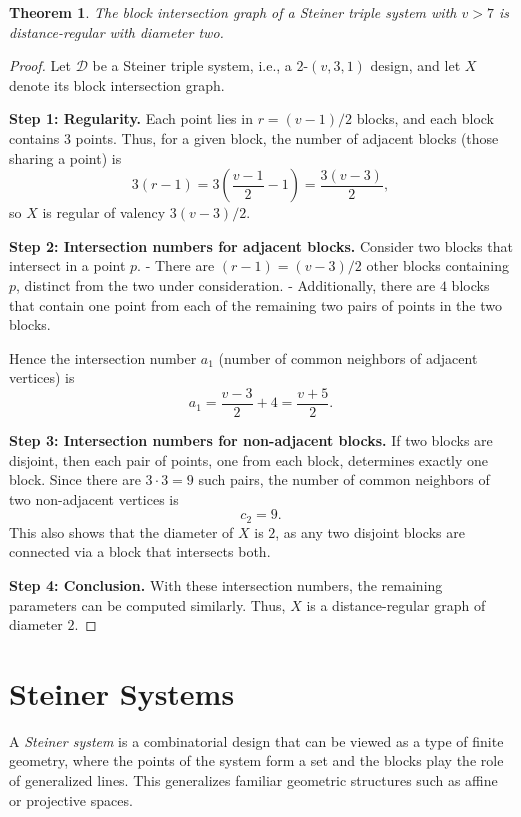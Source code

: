 \documentclass[12pt,a4paper,openany]{book}
\newtheorem{theorem}{Theorem}[section]
\begin{document}
\begin{theorem} \label{thm:5.10.4}
The block intersection graph of a Steiner triple system with $v > 7$ is distance-regular with diameter two.
\end{theorem}

\begin{proof}
Let $\mathcal{D}$ be a Steiner triple system, i.e., a $2$-$(v,3,1)$ design, and let $X$ denote its block intersection graph.  

\textbf{Step 1: Regularity.}  
Each point lies in $r = (v-1)/2$ blocks, and each block contains $3$ points.  
Thus, for a given block, the number of adjacent blocks (those sharing a point) is
\[
3(r-1) = 3\left(\frac{v-1}{2}-1\right) = \frac{3(v-3)}{2},
\]
so $X$ is regular of valency $3(v-3)/2$.

\textbf{Step 2: Intersection numbers for adjacent blocks.}  
Consider two blocks that intersect in a point $p$.  
- There are $(r-1) = (v-3)/2$ other blocks containing $p$, distinct from the two under consideration.  
- Additionally, there are $4$ blocks that contain one point from each of the remaining two pairs of points in the two blocks.  

Hence the intersection number $a_1$ (number of common neighbors of adjacent vertices) is
\[
a_1 = \frac{v-3}{2} + 4 = \frac{v+5}{2}.
\]

\textbf{Step 3: Intersection numbers for non-adjacent blocks.}  
If two blocks are disjoint, then each pair of points, one from each block, determines exactly one block.  
Since there are $3 \cdot 3 = 9$ such pairs, the number of common neighbors of two non-adjacent vertices is
\[
c_2 = 9.
\]
This also shows that the diameter of $X$ is $2$, as any two disjoint blocks are connected via a block that intersects both.

\textbf{Step 4: Conclusion.}  
With these intersection numbers, the remaining parameters can be computed similarly.  
Thus, $X$ is a distance-regular graph of diameter $2$.
\end{proof}






\section{Steiner Systems}

A \emph{Steiner system} is a combinatorial design that can be viewed as a type of finite geometry, where the points of the system form a set and the blocks play the role of generalized lines. This generalizes familiar geometric structures such as affine or projective spaces.  
\end{document}
